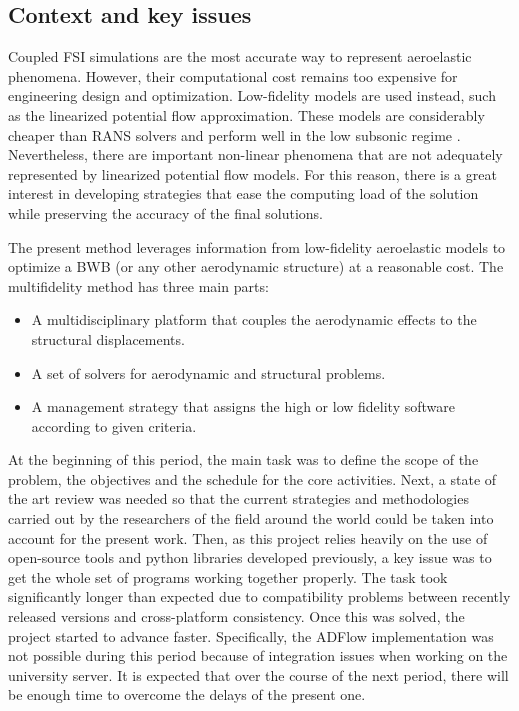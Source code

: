 \subsection{Context and key issues}
Coupled FSI simulations are the most accurate way to represent aeroelastic phenomena. However, their computational cost  remains too expensive for engineering design and optimization. Low-fidelity models are used instead, such as the linearized potential flow approximation. These models are considerably cheaper than RANS solvers and perform well in the low subsonic regime \cite{Marques2019}. Nevertheless, there are important non-linear phenomena that are not adequately represented by linearized potential flow models. For this reason, there is a great interest in developing strategies that ease the computing load of the solution while preserving the accuracy of the final solutions. \par
The present method leverages information from low-fidelity aeroelastic models to optimize a BWB (or any other aerodynamic structure) at a reasonable cost. The multifidelity method has three main parts: 
\begin{itemize}
    \item A multidisciplinary platform that couples the aerodynamic effects to the structural displacements.
    \item A set of solvers for aerodynamic and structural problems.
    \item A management strategy that assigns the high or low fidelity software according to given criteria.
\end{itemize}\par
At the beginning of this period, the main task was to define the scope of the problem, the objectives and the schedule for the core activities. Next, a state of the art review was needed so that the current strategies and methodologies carried out by the researchers of the field around the world could be taken into account for the present work. Then, as this project relies heavily on the use of open-source tools and python libraries developed previously, a key issue was to get the whole set of programs working together properly. The task took significantly longer than expected due to compatibility problems between recently released versions and cross-platform consistency. Once this was solved, the project started to advance faster. Specifically, the ADFlow implementation was not possible during this period because of integration issues when working on the university server. It is expected that over the course of the next period, there will be enough time to overcome the delays of the present one. 

